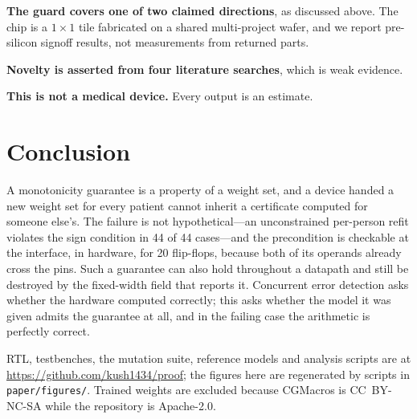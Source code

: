 \documentclass[conference]{IEEEtran}
\begin{document}
\textbf{The guard covers one of two claimed directions}, as discussed above.
The chip is a $1\times1$ tile fabricated on a shared multi-project wafer, and
we report pre-silicon signoff results, not measurements from returned parts.

\textbf{Novelty is asserted from four literature searches}, which is weak
evidence.

\textbf{This is not a medical device.} Every output is an estimate.

\section{Conclusion}

A monotonicity guarantee is a property of a weight set, and a device handed a
new weight set for every patient cannot inherit a certificate computed for
someone else's. The failure is not hypothetical---an unconstrained per-person
refit violates the sign condition in 44 of 44 cases---and the precondition is
checkable at the interface, in hardware, for 20 flip-flops, because both of its
operands already cross the pins. Such a guarantee can also hold throughout a
datapath and still be destroyed by the fixed-width field that reports it.
Concurrent error detection asks whether the hardware computed correctly; this
asks whether the model it was given admits the guarantee at all, and in the
failing case the arithmetic is perfectly correct.

RTL, testbenches, the mutation suite, reference models and analysis scripts are
at \url{https://github.com/kush1434/proof}; the figures here are regenerated by
scripts in \texttt{paper/figures/}. Trained weights are excluded because
CGMacros is CC~BY-NC-SA while the repository is Apache-2.0.
\end{document}
